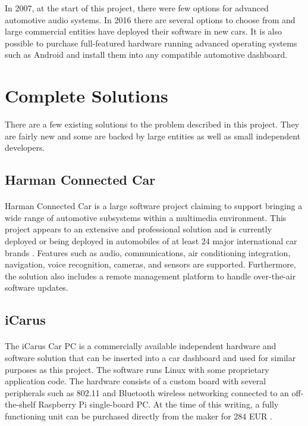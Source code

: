 In 2007, at the start of this project, there were few options for advanced automotive audio systems.
In 2016 there are several options to choose from and large commercial entities have deployed their software in new cars.
It is also possible to purchase full-featured hardware running advanced operating systems such as Android and install them into any compatible automotive dashboard.

\section{Complete Solutions}

There are a few existing solutions to the problem described in this project.
They are fairly new and some are backed by large entities as well as small independent developers.

\subsection{Harman Connected Car}

\paragraph{}
Harman Connected Car \cite{harman-connected-car} is a large software project claiming to support bringing a wide range of automotive subsystems within a multimedia environment.
This project appears to an extensive and professional solution and is currently deployed or being deployed in automobiles of at least 24 major international car brands \cite{harman-connected-vehicles}.
Features such as audio, communications, air conditioning integration, navigation, voice recognition, cameras, and sensors are supported.
Furthermore, the solution also includes a remote management platform to handle over-the-air software updates.

\subsection{iCarus}

\paragraph{}
The iCarus Car PC \cite{icarus} is a commercially available independent  hardware and software solution that can be inserted into a car dashboard and used for similar purposes as this project.
The software runs Linux with some proprietary application code.
The hardware consists of a custom board with several peripherals such as 802.11 and Bluetooth wireless networking connected to an off-the-shelf Raspberry Pi single-board PC.
At the time of this writing, a fully functioning unit can be purchased directly from the maker for 284 EUR \cite{icarus-shop}.

